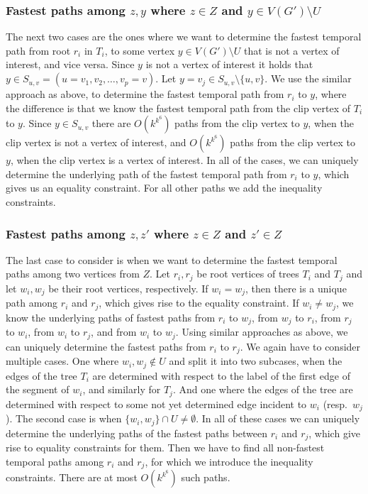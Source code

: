 \documentclass[11pt,a4paper]{article}
\theoremstyle{remark}
\theoremstyle{definition}
\begin{document}
\subsubsection*{\boldmath Fastest paths among $z,y$ where $z \in Z$ and $y \in V(G') \setminus U$}
The next two cases are the ones where we want to determine the fastest temporal path from root $r_i$ in $T_i$, to some vertex $y \in V(G') \setminus U$ that is not a vertex of interest,
and vice versa.
Since $y$ is not a vertex of interest it holds that $y \in S_{u,v}=(u = v_1, v_2, \dots, v_p = v)$. Let $y = v_j \in S_{u,v} \setminus\{u,v\}$.
We use the similar approach as above, to determine the fastest temporal path from $r_i$ to $y$, 
where the difference is that 
we know the fastest temporal path from the clip vertex of $T_i$ to $y$.
Since $y \in S_{u,v}$ there are $O(k^{k^6})$ paths from the clip vertex to $y$, when the clip vertex is not a vertex of interest,
and $O(k^{k^6})$ paths from the clip vertex to $y$, when the clip vertex is a vertex of interest.
In all of the cases, we can uniquely determine the underlying path of the fastest temporal path from $r_i$ to $y$, which gives us an equality constraint.
For all other paths we add the inequality constraints. 


\subsubsection*{\boldmath Fastest paths among $z,z'$ where $z \in Z$ and $z' \in Z$}
The last case to consider is when we want to determine the fastest temporal paths among two vertices from $Z$.
Let $r_i, r_j$ be root vertices of trees $T_i$ and $T_j$ and let $w_i, w_j$ be their root vertices, respectively.
If $w_i = w_j$, then there is a unique path among $r_i$ and $r_j$, which gives rise to the equality constraint.
If $w_i \neq w_j$, we know the underlying paths of fastest paths 
from $r_i$ to $w_j$, from $w_j$ to $r_i$,
from $r_j$ to $w_i$, from $w_i$ to $r_j$,
and from $w_i$ to $w_j$.
Using similar approaches as above, we can uniquely determine the fastest paths from $r_i$ to $r_j$.
We again have to consider multiple cases.
One where $w_i,w_j \notin U$ and 
split it into two subcases, when the edges of the tree $T_i$ are determined with respect to the
label of the first edge of the segment of $w_i$, and similarly for $T_j$.
And one where the edges of the tree are determined with respect to some not yet determined edge incident to $w_i$ (resp.~$w_j$).
The second case is when $\{w_i, w_j\} \cap U \neq \emptyset$.
In all of these cases we can uniquely determine the underlying paths of the fastest paths between $r_i$ and $r_j$,
which give rise to equality constraints for them. 
Then we have to find all non-fastest temporal paths among $r_i$ and $r_j$, for which we introduce the inequality constraints. 
There are at most $O(k^{k^6})$ such paths.
\end{document}
